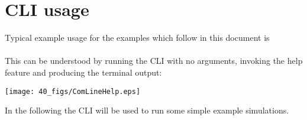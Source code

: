 \section{CLI usage}

Typical example usage for the examples which follow in this document is\\
\\
This can be understood by running the CLI with no arguments, invoking the help feature and producing the terminal output:

\vspace{0.5cm}
%
%
\texttt{[image: 40\_figs/ComLineHelp.eps]}
\vspace{0.5cm}

In the following  the CLI will be used to
run some simple example simulations.
